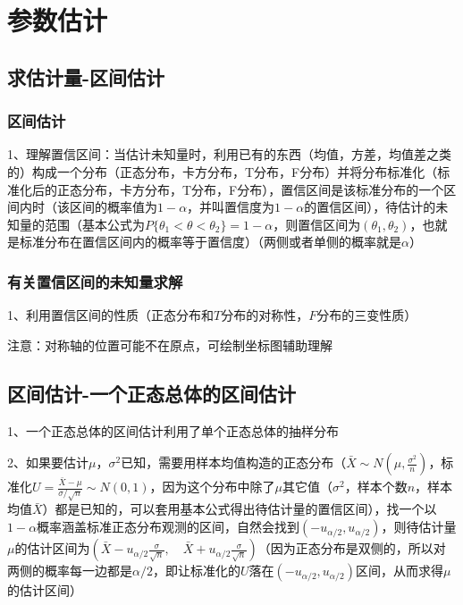 \chapter{参数估计}

\section{求估计量-区间估计}



\subsection{区间估计}

1、理解置信区间：当估计未知量时，利用已有的东西（均值，方差，均值差之类的）构成一个分布（正态分布，卡方分布，T分布，F分布）并将分布标准化（标准化后的正态分布，卡方分布，T分布，F分布），置信区间是该标准分布的一个区间内时（该区间的概率值为$1-\alpha$，并叫置信度为$1-\alpha$的置信区间），待估计的未知量的范围（基本公式为$P\{ \theta_1 < \theta < \theta_2 \} = 1-\alpha$，则置信区间为$(\theta_1 , \theta_2)$，也就是标准分布在置信区间内的概率等于置信度）（两侧或者单侧的概率就是$\alpha$）



\subsection{有关置信区间的未知量求解}

1、利用置信区间的性质（正态分布和$T$分布的对称性，$F$分布的三变性质）

注意：对称轴的位置可能不在原点，可绘制坐标图辅助理解

\section{区间估计-一个正态总体的区间估计}

1、一个正态总体的区间估计利用了单个正态总体的抽样分布

2、如果要估计$\mu$，$\sigma^{2}$已知，需要用样本均值构造的正态分布（$\bar{X} \sim N\left(\mu, \frac{\sigma^{2}}{n}\right)$，标准化$U=\frac{\bar{X}-\mu}{\sigma / \sqrt{n}} \sim N(0,1)$，因为这个分布中除了$\mu$其它值（$\sigma^{2}$，样本个数$n$，样本均值$\bar{X}$）都是已知的，可以套用基本公式得出待估计量的置信区间），找一个以$1−α$概率涵盖标准正态分布观测的区间，自然会找到$(−u_{\alpha/2},u_{\alpha/2})$，则待估计量$\mu$的估计区间为$\left(\bar{X}-u_{{\alpha}/{2}} \frac{\sigma}{\sqrt{n}}, \quad \bar{X}+u_{{\alpha}/{2}} \frac{\sigma}{\sqrt{n}}\right) $（因为正态分布是双侧的，所以对两侧的概率每一边都是$\alpha/2$，即让标准化的$U$落在$(-u_{{\alpha}/{2}},u_{{\alpha}/{2}})$区间，从而求得$\mu$的估计区间）

